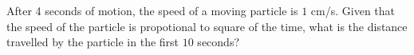 
%
%
%
%
% 
% 

\question[3] After 4 seconds of motion, the speed of a moving particle is $1$ cm/s. 
Given that the speed of the particle is propotional to square of the time, what is
the distance travelled by the particle in the first $10$ seconds?


\ifprintanswers
\fi 

